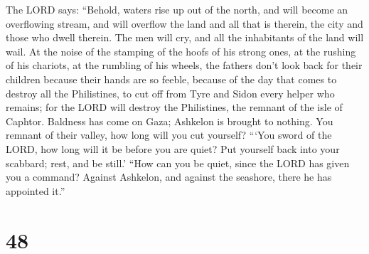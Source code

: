  The LORD says: ``Behold, waters rise up out of the north,
and will become an overflowing stream, and will overflow the land and
all that is therein, the city and those who dwell therein. The men will
cry, and all the inhabitants of the land will wail.  At the
noise of the stamping of the hoofs of his strong ones, at the rushing of
his chariots, at the rumbling of his wheels, the fathers don't look back
for their children because their hands are so feeble, 
because of the day that comes to destroy all the Philistines, to cut off
from Tyre and Sidon every helper who remains; for the LORD will destroy
the Philistines, the remnant of the isle of Caphtor. 
Baldness has come on Gaza; Ashkelon is brought to nothing. You remnant
of their valley, how long will you cut yourself?  ```You
sword of the LORD, how long will it be before you are quiet? Put
yourself back into your scabbard; rest, and be still.' 
``How can you be quiet, since the LORD has given you a command? Against
Ashkelon, and against the seashore, there he has appointed it.''

\hypertarget{section-47}{%
\section{48}\label{section-47}}

